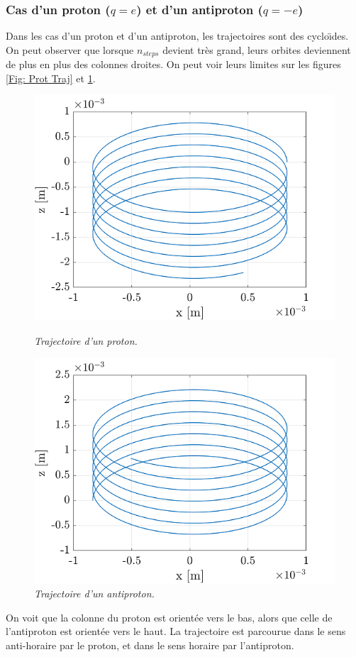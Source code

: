 \documentclass[a4paper,12pt,twoside]{article}
\begin{document}
\subsubsection{Cas d'un proton ($q = e$) et d'un antiproton ($q = -e$)}
\noindent Dans les cas d'un proton et d'un antiproton, les trajectoires sont des cyclo\"\i des. On peut observer que lorsque $n_{steps}$ devient tr\`es grand, leurs orbites deviennent de plus en plus des colonnes droites. On peut voir leurs limites sur les figures \ref{Fig: Prot Traj} et \ref{Fig: Anti Traj}.
\begin{figure}[h]
				\begin{minipage}[c]{.46\linewidth}
					\centering
					\includegraphics[scale = 0.6]{final_traj_prot.png}
					\caption{\em\label{Fig: Prot Traj} Trajectoire d'un proton.}
				\end{minipage}
				\hfill%
				\begin{minipage}[c]{.46\linewidth}
					\centering
					\includegraphics[scale = 0.6]{final_traj_antiprot.png}
					\caption{\em\label{Fig: Anti Traj} Trajectoire d'un antiproton.}
				\end{minipage}
			\end{figure}
On voit que la colonne du proton est orient\'ee vers le bas, alors que celle de l'antiproton est orient\'ee vers le haut. La trajectoire est parcourue dans le sens anti-horaire par le proton, et dans le sens horaire par l'antiproton.
\end{document}
